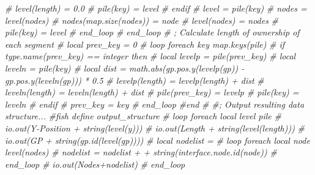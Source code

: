\documentclass[a4paper, nobind]{templates/ociamthesis}
\newenvironment{Shaded}{\begin{snugshade}}{\end{snugshade}}
\newcommand{\CommentTok}[1]{\textcolor[rgb]{0.56,0.35,0.01}{\textit{#1}}}
\renewenvironment{Shaded}
{
  \vspace{10pt}%
  \begin{snugshade}%
}{%
  \end{snugshade}%
  \vspace{8pt}%
}
\begin{document}
\begin{Shaded}
\begin{Highlighting}[]
\CommentTok{\#                level(\textquotesingle{}length\textquotesingle{}) = 0.0}
\CommentTok{\#                pile(key) = level}
\CommentTok{\#            endif}
\CommentTok{\#            level = pile(key)}
\CommentTok{\#            nodes = level(\textquotesingle{}nodes\textquotesingle{})}
\CommentTok{\#            nodes(map.size(nodes)) = node}
\CommentTok{\#            level(\textquotesingle{}nodes\textquotesingle{}) = nodes}
\CommentTok{\#            pile(key) = level}
\CommentTok{\#        end\_loop}
\CommentTok{\#    end\_loop}
\CommentTok{\#    ; Calculate length of ownership of each segment}
\CommentTok{\#    local prev\_key = \textquotesingle{}0\textquotesingle{}}
\CommentTok{\#    loop foreach key map.keys(pile)}
\CommentTok{\#        if type.name(prev\_key) == \textquotesingle{}integer\textquotesingle{} then}
\CommentTok{\#            local levelp = pile(prev\_key)}
\CommentTok{\#            local leveln = pile(key)}
\CommentTok{\#            local dist = math.abs(gp.pos.y(levelp(\textquotesingle{}gp\textquotesingle{})) {-} gp.pos.y(leveln(\textquotesingle{}gp\textquotesingle{}))) * 0.5}
\CommentTok{\#            levelp(\textquotesingle{}length\textquotesingle{}) = levelp(\textquotesingle{}length\textquotesingle{}) + dist}
\CommentTok{\#            leveln(\textquotesingle{}length\textquotesingle{}) = leveln(\textquotesingle{}length\textquotesingle{}) + dist}
\CommentTok{\#            pile(prev\_key) = levelp}
\CommentTok{\#            pile(key) = leveln}
\CommentTok{\#        endif}
\CommentTok{\#        prev\_key = key}
\CommentTok{\#    end\_loop}
\CommentTok{\#end}
\CommentTok{\#}
\CommentTok{\#; Output resulting data structure...}
\CommentTok{\#fish define output\_structure}
\CommentTok{\#    loop foreach local level pile}
\CommentTok{\#        io.out(\textquotesingle{}Y{-}Position \textquotesingle{} + string(level(\textquotesingle{}y\textquotesingle{})))}
\CommentTok{\#        io.out(\textquotesingle{}Length \textquotesingle{} + string(level(\textquotesingle{}length\textquotesingle{})))}
\CommentTok{\#        io.out(\textquotesingle{}GP \textquotesingle{} + string(gp.id(level(\textquotesingle{}gp\textquotesingle{}))))}
\CommentTok{\#        local nodelist = \textquotesingle{}\textquotesingle{}}
\CommentTok{\#        loop foreach local node level(\textquotesingle{}nodes\textquotesingle{})}
\CommentTok{\#            nodelist = nodelist + \textquotesingle{} \textquotesingle{} + string(interface.node.id(node))}
\CommentTok{\#        end\_loop}
\CommentTok{\#        io.out(\textquotesingle{}Nodes\textquotesingle{}+nodelist)}
\CommentTok{\#    end\_loop}

\end{Highlighting}
\end{Shaded}
\end{document}
